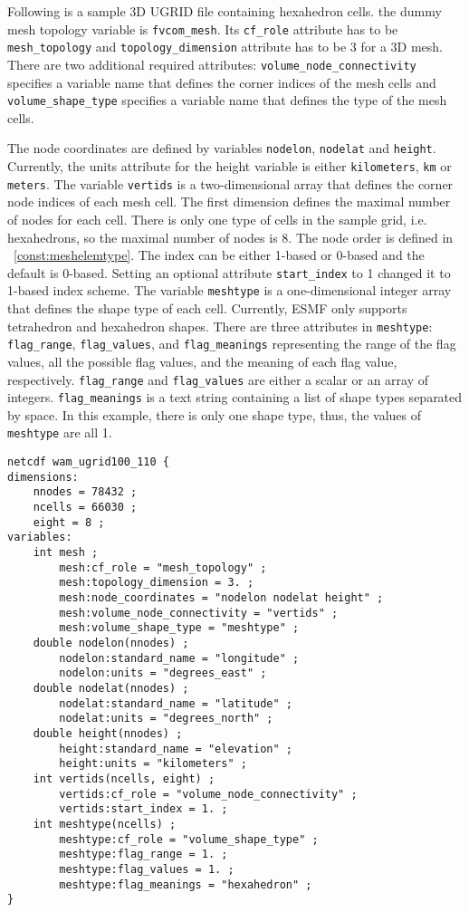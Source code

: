 Following is a sample 3D UGRID file containing hexahedron cells. the dummy mesh topology variable is {\tt fvcom\_mesh}. Its {\tt cf\_role} attribute has to be {\tt mesh\_topology}
and {\tt topology\_dimension} attribute has to be 3 for a 3D mesh.  There are two additional required attributes:
{\tt volume\_node\_connectivity} specifies a variable name that defines the corner indices of the mesh cells and
{\tt volume\_shape\_type} specifies a variable name that defines the type of the mesh cells.

The node coordinates are defined by variables {\tt nodelon}, {\tt nodelat} and {\tt height}. Currently, the units
attribute for the height variable is either {\tt kilometers}, {\tt km} or {\tt meters}.
The variable {\tt vertids} is a two-dimensional array that defines the corner node indices of each mesh cell. The first dimension
defines the maximal number of nodes for each cell. There is only one type of cells in the sample grid, i.e. hexahedrons, so the maximal number
of nodes is 8.  The node order is defined in ~\ref{const:meshelemtype}.  The index can be either 1-based or 0-based and
the default is 0-based.
 Setting an optional attribute {\tt start\_index} to 1 changed it to 1-based index scheme.
The variable {\tt meshtype} is a one-dimensional integer array that defines the shape type of each cell.  Currently, ESMF only
supports tetrahedron and hexahedron shapes. There are three attributes in {\tt meshtype}: {\tt flag\_range}, {\tt flag\_values}, and {\tt flag\_meanings} representing the range of the flag values, all the possible flag values, and the meaning of each flag value, respectively.  {\tt flag\_range} and {\tt flag\_values} are either a scalar or an array of integers.  {\tt flag\_meanings} is a text string containing a list of shape types separated by space. In this example, there
is only one shape type, thus, the values of {\tt meshtype} are all 1.

\begin{verbatim}
netcdf wam_ugrid100_110 {
dimensions:
	nnodes = 78432 ;
	ncells = 66030 ;
	eight = 8 ;
variables:
	int mesh ;
		mesh:cf_role = "mesh_topology" ;
		mesh:topology_dimension = 3. ;
		mesh:node_coordinates = "nodelon nodelat height" ;
		mesh:volume_node_connectivity = "vertids" ;
		mesh:volume_shape_type = "meshtype" ;
	double nodelon(nnodes) ;
		nodelon:standard_name = "longitude" ;
		nodelon:units = "degrees_east" ;
	double nodelat(nnodes) ;
		nodelat:standard_name = "latitude" ;
		nodelat:units = "degrees_north" ;
	double height(nnodes) ;
		height:standard_name = "elevation" ;
		height:units = "kilometers" ;
	int vertids(ncells, eight) ;
		vertids:cf_role = "volume_node_connectivity" ;
		vertids:start_index = 1. ;
	int meshtype(ncells) ;
		meshtype:cf_role = "volume_shape_type" ;
		meshtype:flag_range = 1. ;
		meshtype:flag_values = 1. ;
		meshtype:flag_meanings = "hexahedron" ;
}
\end{verbatim}


